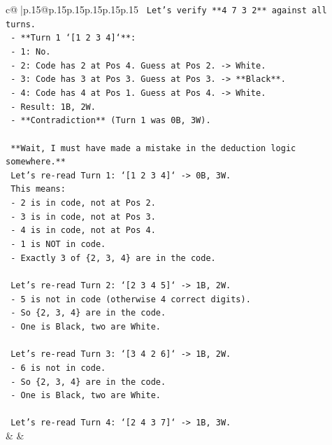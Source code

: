 \documentclass{article}
\begin{document}
{\begin{supertabular}{c@{$\;$}|p{.15\linewidth}@{}p{.15\linewidth}p{.15\linewidth}p{.15\linewidth}p{.15\linewidth}p{.15\linewidth}}
{{{\texttt{        Let's verify **4 7 3 2** against all turns.} \\
\texttt{        {-} **Turn 1 `{[}1 2 3 4{]}`**:} \\
\texttt{          {-} 1: No.} \\
\texttt{          {-} 2: Code has 2 at Pos 4. Guess at Pos 2. {-}> White.} \\
\texttt{          {-} 3: Code has 3 at Pos 3. Guess at Pos 3. {-}> **Black**.} \\
\texttt{          {-} 4: Code has 4 at Pos 1. Guess at Pos 4. {-}> White.} \\
\texttt{          {-} Result: 1B, 2W.} \\
\texttt{          {-} **Contradiction** (Turn 1 was 0B, 3W).} \\
\\ 
\texttt{        **Wait, I must have made a mistake in the deduction logic somewhere.**} \\
\texttt{        Let's re{-}read Turn 1: `{[}1 2 3 4{]}` {-}> 0B, 3W.} \\
\texttt{        This means:} \\
\texttt{        {-} 2 is in code, not at Pos 2.} \\
\texttt{        {-} 3 is in code, not at Pos 3.} \\
\texttt{        {-} 4 is in code, not at Pos 4.} \\
\texttt{        {-} 1 is NOT in code.} \\
\texttt{        {-} Exactly 3 of \{2, 3, 4\} are in the code.} \\
\\ 
\texttt{        Let's re{-}read Turn 2: `{[}2 3 4 5{]}` {-}> 1B, 2W.} \\
\texttt{        {-} 5 is not in code (otherwise 4 correct digits).} \\
\texttt{        {-} So \{2, 3, 4\} are in the code.} \\
\texttt{        {-} One is Black, two are White.} \\
\\ 
\texttt{        Let's re{-}read Turn 3: `{[}3 4 2 6{]}` {-}> 1B, 2W.} \\
\texttt{        {-} 6 is not in code.} \\
\texttt{        {-} So \{2, 3, 4\} are in the code.} \\
\texttt{        {-} One is Black, two are White.} \\
\\ 
\texttt{        Let's re{-}read Turn 4: `{[}2 4 3 7{]}` {-}> 1B, 3W.} \\
            }
        }
    }
    & & \\ \\


\end{supertabular}}
\end{document}
